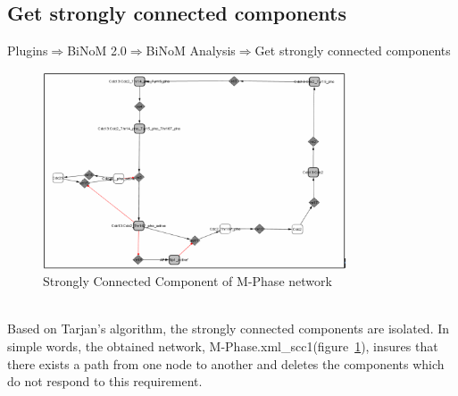 \subsection{Get strongly connected components}
Plugins$\Rightarrow$BiNoM 2.0$\Rightarrow$BiNoM Analysis$\Rightarrow$Get strongly connected components\\
\begin{figure}
\centering
\includegraphics[width=0.8\textwidth]{graphics/Strongly_Connected_Component_of_M-Phase_network.png}
\caption{Strongly Connected Component of M-Phase network}
\label{Strongly_Connected_Component_of M-Phase_network}
\end{figure}
\\Based on Tarjan’s algorithm\cite{tarjan1972depth}, the strongly connected components are isolated. In simple words, the obtained network, M-Phase.xml\_scc1(figure~\ref{Strongly_Connected_Component_of M-Phase_network}), insures that there exists a path from one node to another and deletes the components which do not respond to this requirement.


